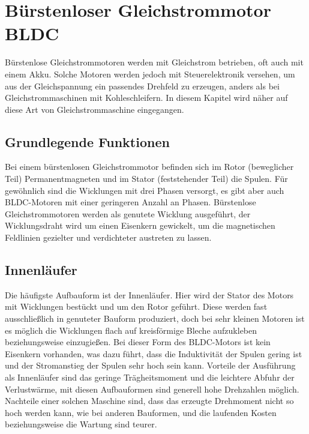 \section{Bürstenloser Gleichstrommotor BLDC}
Bürstenlose Gleichstrommotoren werden mit Gleichstrom betrieben, oft auch mit einem Akku. Solche Motoren werden jedoch mit Steuerelektronik versehen, um aus der Gleichspannung ein passendes Drehfeld zu erzeugen, anders als bei Gleichstrommaschinen mit Kohleschleifern. In diesem Kapitel wird näher auf diese Art von Gleichstrommaschine eingegangen. 
\cite{wiki:BLDC}

\subsection{Grundlegende Funktionen}
Bei einem bürstenlosen Gleichstrommotor befinden sich im Rotor (beweglicher Teil) Permanentmagneten und im Stator (feststehender Teil) die Spulen. Für gewöhnlich sind die Wicklungen mit drei Phasen versorgt, es gibt aber auch BLDC-Motoren mit einer geringeren Anzahl an Phasen. Bürstenlose Gleichstrommotoren werden als genutete Wicklung ausgeführt, der Wicklungsdraht wird um einen Eisenkern gewickelt, um die magnetischen Feldlinien gezielter und verdichteter austreten zu lassen. 
\cite{wiki:BLDC}

\subsection{Innenläufer}
Die häufigste Aufbauform ist der Innenläufer. Hier wird der Stator des Motors mit Wicklungen bestückt und um den Rotor geführt. Diese werden fast ausschlie{\ss}lich in genuteter Bauform produziert, doch bei sehr kleinen Motoren ist es möglich die Wicklungen flach auf kreisförmige Bleche aufzukleben beziehungsweise einzugie{\ss}en. Bei dieser Form des BLDC-Motors ist kein Eisenkern vorhanden, was dazu führt, dass die Induktivität der Spulen gering ist und der Stromanstieg der Spulen sehr hoch sein kann. Vorteile der Ausführung als Innenläufer sind das geringe Trägheitsmoment und die leichtere Abfuhr der Verlustwärme, mit diesen Aufbauformen sind generell hohe Drehzahlen möglich. Nachteile einer solchen Maschine sind, dass das erzeugte Drehmoment nicht so hoch werden kann, wie bei anderen Bauformen, und die laufenden Kosten beziehungsweise die Wartung sind teurer. 

\cite{nanotec:BLDC}
\cite{lgeeks:BLDC}

